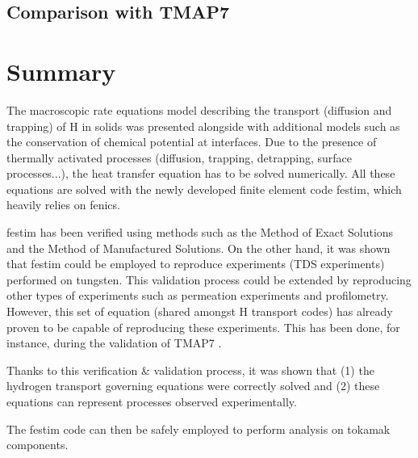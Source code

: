 \subsection{Comparison with TMAP7}



\section{Summary}

The macroscopic rate equations model describing the transport (diffusion and trapping) of H in solids was presented alongside with additional models such as the conservation of chemical potential at interfaces.
Due to the presence of thermally activated processes (diffusion, trapping, detrapping, surface processes...), the heat transfer equation has to be solved numerically.
All these equations are solved with the newly developed finite element code \gls{festim}, which heavily relies on \gls{fenics}.

\gls{festim} has been verified using methods such as the Method of Exact Solutions and the Method of Manufactured Solutions.
On the other hand, it was shown that \gls{festim} could be employed to reproduce experiments (TDS experiments) performed on tungsten.
This validation process could be extended by reproducing other types of experiments such as permeation experiments and profilometry.
However, this set of equation (shared amongst H transport codes) has already proven to be capable of reproducing these experiments.
This has been done, for instance, during the validation of TMAP7 .

Thanks to this verification \& validation process, it was shown that (1) the hydrogen transport governing equations were correctly solved and (2) these equations can represent processes observed experimentally.

The \gls{festim} code can then be safely employed to perform analysis on tokamak components.

